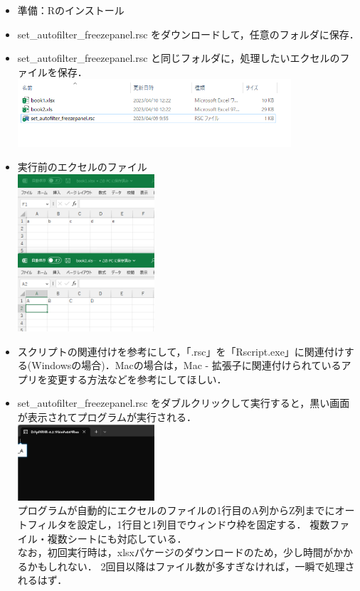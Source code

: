 \documentclass[
]{article}
\providecommand{\tightlist}{%
  \setlength{\itemsep}{0pt}\setlength{\parskip}{0pt}}
\begin{document}
\begin{itemize}
\tightlist
\item
  準備：Rのインストール\\
\item
  set\_autofilter\_freezepanel.rsc
  をダウンロードして，任意のフォルダに保存．\\
\item
  set\_autofilter\_freezepanel.rsc と同じフォルダに，処理したいエクセルのファイルを保存．\\
  \includegraphics[width=0.8\textwidth,height=\textheight]{img/set_autofilter_freezepanel01.png}\\
\item
  実行前のエクセルのファイル\\
  \includegraphics[width=0.4\textwidth,height=\textheight]{img/set_autofilter_freezepanel02.png}\\
\item
  スクリプトの関連付けを参考にして，「.rsc」を「Rscript.exe」に関連付けする(Windowsの場合)．Macの場合は，Mac - 拡張子に関連付けられているアプリを変更する方法などを参考にしてほしい．\\
\item
  set\_autofilter\_freezepanel.rsc をダブルクリックして実行すると，黒い画面が表示されてプログラムが実行される．\\
  \includegraphics[width=0.4\textwidth,height=\textheight]{img/set_autofilter_freezepanel03.png}\\
  プログラムが自動的にエクセルのファイルの1行目のA列からZ列までにオートフィルタを設定し，1行目と1列目でウィンドウ枠を固定する．
  複数ファイル・複数シートにも対応している．\\
  なお，初回実行時は，xlsxパケージのダウンロードのため，少し時間がかかるかもしれない．
  2回目以降はファイル数が多すぎなければ，一瞬で処理されるはず．
\end{itemize}
\end{document}
